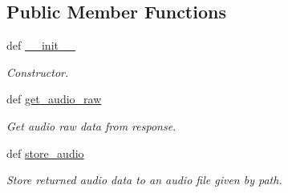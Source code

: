 \subsection*{Public Member Functions}
\begin{DoxyCompactItemize}
\item 
def \hyperlink{classRappCloud_1_1CloudMsgs_1_1TextToSpeech_1_1TextToSpeech_1_1Response_ab916c84bf6afb304d2839e6d8e70776e}{\-\_\-\-\_\-init\-\_\-\-\_\-}
\begin{DoxyCompactList}\small\item\em Constructor. \end{DoxyCompactList}\item 
def \hyperlink{classRappCloud_1_1CloudMsgs_1_1TextToSpeech_1_1TextToSpeech_1_1Response_ae650646d41a1e4cd36f4a6031c480d3c}{get\-\_\-audio\-\_\-raw}
\begin{DoxyCompactList}\small\item\em Get audio raw data from response. \end{DoxyCompactList}\item 
def \hyperlink{classRappCloud_1_1CloudMsgs_1_1TextToSpeech_1_1TextToSpeech_1_1Response_af32e132f31cfcc803da287ed3d3f0190}{store\-\_\-audio}
\begin{DoxyCompactList}\small\item\em Store returned audio data to an audio file given by path. \end{DoxyCompactList}\end{DoxyCompactItemize}
